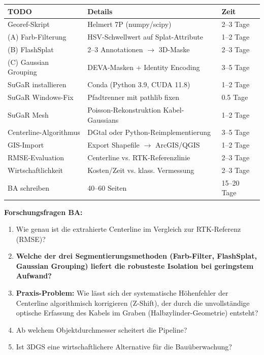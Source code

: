 \documentclass[11pt, a4paper]{article}
\begin{document}
\begin{center}
\small
\begin{tabular}{|p{3.5cm}|p{6.5cm}|p{2.5cm}|}
\hline
\textbf{TODO} & \textbf{Details} & \textbf{Zeit} \\
\hline
Georef-Skript & Helmert 7P (numpy/scipy) & 2--3 Tage \\
\hline
(A) Farb-Filterung & HSV-Schwellwert auf Splat-Attribute & 1--2 Tage \\
\hline
(B) FlashSplat & 2--3 Annotationen $\rightarrow$ 3D-Maske & 2--3 Tage \\
\hline
(C) Gaussian Grouping & DEVA-Masken + Identity Encoding & 3--5 Tage \\
\hline
SuGaR installieren & Conda (Python 3.9, CUDA 11.8) & 1--2 Tage \\
\hline
SuGaR Windows-Fix & Pfadtrenner mit pathlib fixen & 0.5 Tage \\
\hline
SuGaR Mesh & Poisson-Rekonstruktion Kabel-Gaussians & 1--2 Tage \\
\hline
Centerline-Algorithmus & DGtal oder Python-Reimplementierung & 3--5 Tage \\
\hline
GIS-Import & Export Shapefile $\rightarrow$ ArcGIS/QGIS & 1--2 Tage \\
\hline
RMSE-Evaluation & Centerline vs. RTK-Referenzlinie & 2--3 Tage \\
\hline
Wirtschaftlichkeit & Kosten/Zeit vs. klass. Vermessung & 2--3 Tage \\
\hline
BA schreiben & 40--60 Seiten & 15--20 Tage \\
\hline
\end{tabular}
\end{center}

\textbf{Forschungsfragen BA:}
\begin{enumerate}[noitemsep]
    \item Wie genau ist die extrahierte Centerline im Vergleich zur RTK-Referenz (RMSE)?
    \item \textbf{Welche der drei Segmentierungsmethoden (Farb-Filter, FlashSplat, Gaussian Grouping) liefert die robusteste Isolation bei geringstem Aufwand?}
    \item \textbf{Praxis-Problem:} Wie l\"asst sich der systematische H\"ohenfehler der Centerline algorithmisch korrigieren (Z-Shift), der durch die unvollst\"andige optische Erfassung des Kabels im Graben (Halbzylinder-Geometrie) entsteht?
    \item Ab welchem Objektdurchmesser scheitert die Pipeline?
    \item Ist 3DGS eine wirtschaftlichere Alternative f\"ur die Bau\"uberwachung?
\end{enumerate}
\end{document}
